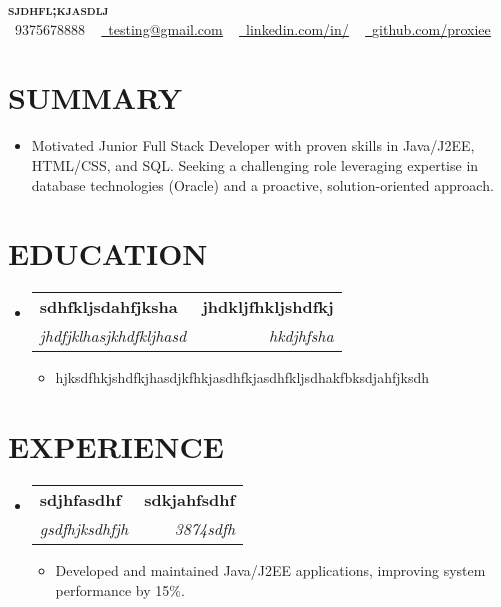 \documentclass[letterpaper,11pt]{article}
\makeatletter
\newcommand{\resumeItem}[1]{\item\small{{#1 \vspace{-3pt}}}}
\newcommand{\resumeSubheading}[4]{\vspace{-2pt}\item\begin{tabular*}{0.97\textwidth}[t]{l@{\extracolsep{\fill}}r}\textbf{#1} & #2 \\\textit{\small#3} & \textit{\small #4} \\\end{tabular*}\vspace{-7pt}}
\newcommand{\resumeSubHeadingListStart}{\begin{itemize}[leftmargin=0.15in, label={}]}
\newcommand{\resumeSubHeadingListEnd}{\end{itemize}}
\newcommand{\resumeItemListStart}{\begin{itemize}}
\newcommand{\resumeItemListEnd}{\end{itemize}\vspace{-5pt}}
\makeatother
\begin{document}
\begin{center}
    \textbf{\Huge \scshape {\fontsize{15pt}{20pt}\selectfont sjdhfl;kjasdlj}} \\ \vspace{1pt}
    \small \raisebox{-0.1\height}\faPhone\ 9375678888 ~ \href{mailto:testing@gmail.com}{\raisebox{-0.2\height}\faEnvelope\  \underline{testing@gmail.com}} ~ 
    \href{https://www.linkedin.com/feed/}{\raisebox{-0.2\height}\faLinkedin\ \underline{linkedin.com/in/}} ~ 
    \href{https://github.com/proxiee}{\raisebox{-0.2\height}\faGithub\ \underline{github.com/proxiee}}
    \vspace{-8pt}
\end{center}

\section{{\fontsize{9pt}{20pt}\selectfont \textbf{SUMMARY}}}\resumeSubHeadingListStart
\resumeItem{Motivated Junior Full Stack Developer with proven skills in Java/J2EE, HTML/CSS, and SQL.  Seeking a challenging role leveraging expertise in database technologies (Oracle) and a proactive, solution-oriented approach.}
\resumeSubHeadingListEnd\vspace{-18pt}
\section{{\fontsize{9pt}{20pt}\selectfont \textbf{EDUCATION}}}\resumeSubHeadingListStart
\resumeSubheading{sdhfkljsdahfjksha}{\textbf{jhdkljfhkljshdfkj}}{jhdfjklhasjkhdfkljhasd}{hkdjhfsha}
\resumeItemListStart
\resumeItem{hjksdfhkjshdfkjhasdjkfhkjasdhfkjasdhfkljsdhakfbksdjahfjksdh}
\resumeItemListEnd
\resumeSubHeadingListEnd\vspace{-18pt}
\section{{\fontsize{9pt}{20pt}\selectfont \textbf{EXPERIENCE}}}\resumeSubHeadingListStart
\resumeSubheading{sdjhfasdhf}{\textbf{sdkjahfsdhf}}{gsdfhjksdhfjh}{3874sdfh}
\resumeItemListStart
\resumeItem{Developed and maintained Java/J2EE applications, improving system performance by 15\%.}
\resumeItemListEnd
\resumeSubHeadingListEnd\vspace{-17pt}
\end{document}
